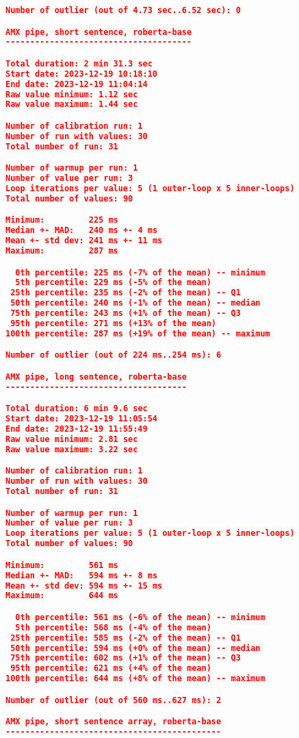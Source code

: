 \begin{lstlisting}[language=json]
Number of outlier (out of 4.73 sec..6.52 sec): 0

AMX pipe, short sentence, roberta-base
--------------------------------------

Total duration: 2 min 31.3 sec
Start date: 2023-12-19 10:18:10
End date: 2023-12-19 11:04:14
Raw value minimum: 1.12 sec
Raw value maximum: 1.44 sec

Number of calibration run: 1
Number of run with values: 30
Total number of run: 31

Number of warmup per run: 1
Number of value per run: 3
Loop iterations per value: 5 (1 outer-loop x 5 inner-loops)
Total number of values: 90

Minimum:         225 ms
Median +- MAD:   240 ms +- 4 ms
Mean +- std dev: 241 ms +- 11 ms
Maximum:         287 ms

  0th percentile: 225 ms (-7% of the mean) -- minimum
  5th percentile: 229 ms (-5% of the mean)
 25th percentile: 235 ms (-2% of the mean) -- Q1
 50th percentile: 240 ms (-1% of the mean) -- median
 75th percentile: 243 ms (+1% of the mean) -- Q3
 95th percentile: 271 ms (+13% of the mean)
100th percentile: 287 ms (+19% of the mean) -- maximum

Number of outlier (out of 224 ms..254 ms): 6

AMX pipe, long sentence, roberta-base
-------------------------------------

Total duration: 6 min 9.6 sec
Start date: 2023-12-19 11:05:54
End date: 2023-12-19 11:55:49
Raw value minimum: 2.81 sec
Raw value maximum: 3.22 sec

Number of calibration run: 1
Number of run with values: 30
Total number of run: 31

Number of warmup per run: 1
Number of value per run: 3
Loop iterations per value: 5 (1 outer-loop x 5 inner-loops)
Total number of values: 90

Minimum:         561 ms
Median +- MAD:   594 ms +- 8 ms
Mean +- std dev: 594 ms +- 15 ms
Maximum:         644 ms

  0th percentile: 561 ms (-6% of the mean) -- minimum
  5th percentile: 568 ms (-4% of the mean)
 25th percentile: 585 ms (-2% of the mean) -- Q1
 50th percentile: 594 ms (+0% of the mean) -- median
 75th percentile: 602 ms (+1% of the mean) -- Q3
 95th percentile: 621 ms (+4% of the mean)
100th percentile: 644 ms (+8% of the mean) -- maximum

Number of outlier (out of 560 ms..627 ms): 2

AMX pipe, short sentence array, roberta-base
--------------------------------------------


\end{lstlisting}
